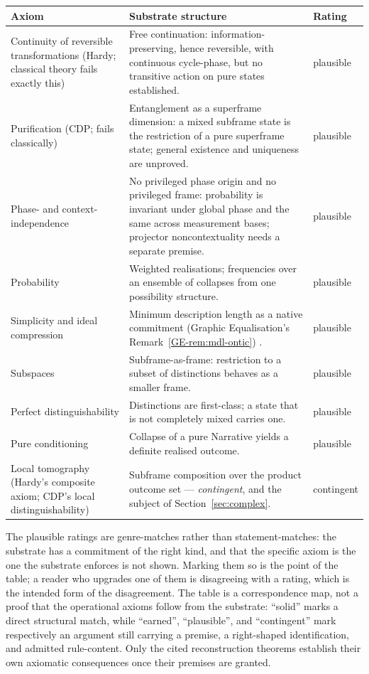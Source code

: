\documentclass[11pt,a4paper]{article}
\theoremstyle{remark}\newtheorem{remark}[definition]{Remark}
\begin{document}
\begin{center}\small
\begin{tabular}{@{}>{\raggedright\arraybackslash}p{}
                >{\raggedright\arraybackslash}p{}
                >{\raggedright\arraybackslash}p{}@{}}
\toprule
\textbf{Axiom} & \textbf{Substrate structure} & \textbf{Rating}\\
\midrule
Continuity of reversible transformations (Hardy; classical theory fails exactly this) & Free continuation: information-preserving, hence reversible, with continuous cycle-phase, but no transitive action on pure states established. & plausible\\
Purification (CDP; fails classically) & Entanglement as a superframe dimension: a mixed subframe state is the restriction of a pure superframe state; general existence and uniqueness are unproved. & plausible\\
Phase- and context-independence & No privileged phase origin and no privileged frame: probability is invariant under global phase and the same across measurement bases; projector noncontextuality needs a separate premise. & plausible\\
Probability & Weighted realisations; frequencies over an ensemble of collapses from one possibility structure. & plausible\\
Simplicity and ideal compression & Minimum description length as a native commitment (Graphic Equalisation's Remark~\ref{GE-rem:mdl-ontic}) \citep{rissanen1978}. & plausible\\
Subspaces & Subframe-as-frame: restriction to a subset of distinctions behaves as a smaller frame. & plausible\\
Perfect distinguishability & Distinctions are first-class; a state that is not completely mixed carries one. & plausible\\
Pure conditioning & Collapse of a pure Narrative yields a definite realised outcome. & plausible\\
Local tomography (Hardy's composite axiom; CDP's local distinguishability) & Subframe composition over the product outcome set --- \emph{contingent}, and the subject of Section~\ref{sec:complex}. & contingent\\
\bottomrule
\end{tabular}
\end{center}

The plausible ratings are genre-matches rather than statement-matches: the
substrate has a commitment of the right kind, and that the specific axiom is the
one the substrate enforces is not shown. Marking them so is the point of the
table; a reader who upgrades one of them is disagreeing with a rating, which is
the intended form of the disagreement. The table is a correspondence map, not a
proof that the operational axioms follow from the substrate: ``solid'' marks a
direct structural match, while ``earned'', ``plausible'', and ``contingent'' mark
respectively an argument still carrying a premise, a right-shaped identification,
and admitted rule-content. Only the cited reconstruction theorems establish their
own axiomatic consequences once their premises are granted.
\end{document}
